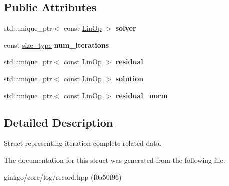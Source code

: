 \subsection*{Public Attributes}
\begin{DoxyCompactItemize}
\item 
\mbox{\label{structgko_1_1log_1_1iteration__complete__data_af485c2d5eff3114076e057b9870106a8}} 
std\+::unique\+\_\+ptr$<$ const \hyperlink{classgko_1_1LinOp}{Lin\+Op} $>$ {\bfseries solver}
\item 
\mbox{\label{structgko_1_1log_1_1iteration__complete__data_a8d5fd7bf89def95a904e95b3f0848594}} 
const \hyperlink{namespacegko_a6e5c95df0ae4e47aab2f604a22d98ee7}{size\+\_\+type} {\bfseries num\+\_\+iterations}
\item 
\mbox{\label{structgko_1_1log_1_1iteration__complete__data_a52473dac8d5ac7849b6dbd7523cdeb37}} 
std\+::unique\+\_\+ptr$<$ const \hyperlink{classgko_1_1LinOp}{Lin\+Op} $>$ {\bfseries residual}
\item 
\mbox{\label{structgko_1_1log_1_1iteration__complete__data_a232f312a1a4c2f8817e208ec2013c454}} 
std\+::unique\+\_\+ptr$<$ const \hyperlink{classgko_1_1LinOp}{Lin\+Op} $>$ {\bfseries solution}
\item 
\mbox{\label{structgko_1_1log_1_1iteration__complete__data_a26a787138ac7faeced0420c5d02371cb}} 
std\+::unique\+\_\+ptr$<$ const \hyperlink{classgko_1_1LinOp}{Lin\+Op} $>$ {\bfseries residual\+\_\+norm}
\end{DoxyCompactItemize}


\subsection{Detailed Description}
Struct representing iteration complete related data. 

The documentation for this struct was generated from the following file\+:\begin{DoxyCompactItemize}
\item 
ginkgo/core/log/record.\+hpp (f0a50f96)\end{DoxyCompactItemize}
